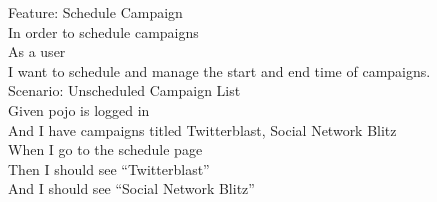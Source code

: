 \documentclass[12pt]{article}
\begin{document}
Feature: Schedule Campaign \\
  In order to schedule campaigns \\
  As a user \\
  I want to schedule and manage the start and end time of campaigns. \\

Scenario: Unscheduled Campaign List \\
  Given pojo is logged in \\
  And I have campaigns titled Twitterblast, Social Network Blitz \\
  When I go to the schedule page \\
  Then I should see ``Twitterblast'' \\
  And I should see ``Social Network Blitz'' \\
\end{document}
